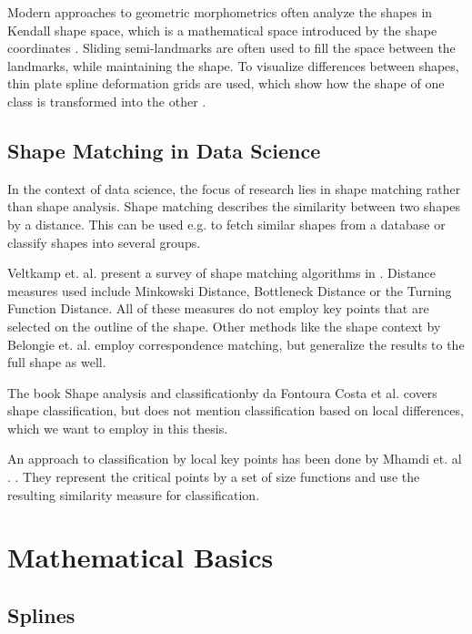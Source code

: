 \documentclass[pdftex,12pt,a4paper]{report}
\begin{document}
Modern approaches to geometric morphometrics often analyze the shapes in Kendall shape space, which is a mathematical space introduced by the shape coordinates \cite{mitteroecker2009advances}. Sliding semi-landmarks are often used to fill the space between the landmarks, while maintaining the shape. To visualize differences between shapes, thin plate spline deformation grids are used, which show how the shape of one class is transformed into the other \cite{adams2004geometric}.

\section{Shape Matching in Data Science}

In the context of data science, the focus of research lies in shape matching rather than shape analysis. Shape matching describes the similarity between two shapes by a distance. This can be used e.g. to fetch similar shapes from a database or classify shapes into several groups.

Veltkamp et. al. present a survey of shape matching algorithms in \cite{veltkamp2001shape}. Distance measures used include Minkowski Distance, Bottleneck Distance or the Turning Function Distance. All of these measures do not employ key points that are selected on the outline of the shape. Other methods like the shape context by Belongie et. al. \cite{belongie2002shape} employ correspondence matching, but generalize the results to the full shape as well.

The book \grqq Shape analysis and classification\grqq  by da Fontoura Costa et al. \cite{da2010shape} covers shape classification, but does not mention classification based on local differences, which we want to employ in this thesis.

An approach to classification by local key points has been done by Mhamdi et. al . \cite{mhamdi2014local}. They represent the critical points by a set of size functions and use the resulting similarity measure for classification.

\chapter{Mathematical Basics}
\label{chapter:basics}

\section{Splines}
\label{section:splines}
\end{document}
